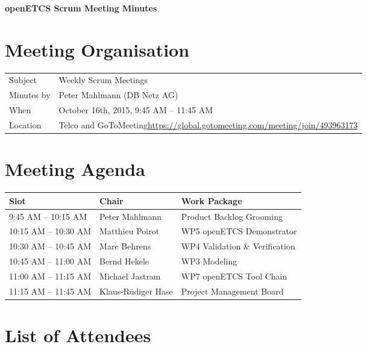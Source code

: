 \documentclass[a4paper, 11pt]{article}
\begin{document}
{\begin{center}\huge\bf openETCS Scrum Meeting Minutes\end{center}}

\section{Meeting Organisation}

\renewcommand{\arraystretch}{1.5}
\begin{supertabular}{m{.2\textwidth}m{.8\textwidth}}
Subject & Weekly Scrum Meetings\\
Minutes by & Peter Mahlmann (DB Netz AG)\\
When & October 16th, 2015, 9:45 AM -- 11:45 AM\\
Location & Telco and GoToMeeting\newline \url{https://global.gotomeeting.com/meeting/join/493963173}\\
\end{supertabular}

\renewcommand{\arraystretch}{1.0}
\section{Meeting Agenda}

\begin{tabular}{lll}
\toprule
\textbf{Slot} &  \textbf{Chair} & \textbf{Work Package} \\
\midrule 
9:45 AM -- 10:15 AM & Peter Mahlmann & Product Backlog Grooming  \\
10:15 AM -- 10:30 AM & Matthieu Poirot & WP5 openETCS Demonstrator \\  
10:30 AM -- 10:45 AM & Marc Behrens & WP4 Validation \& Verification \\
10:45 AM -- 11:00 AM & Bernd Hekele & WP3 Modeling \\
11:00 AM -- 11:15 AM & Michael Jastram & WP7 openETCS Tool Chain \\
11:15 AM -- 11:45 AM & Klaus-R\"udiger Hase & Project Management Board \\
\bottomrule
\end{tabular}

\section{List of Attendees}
\end{document}
